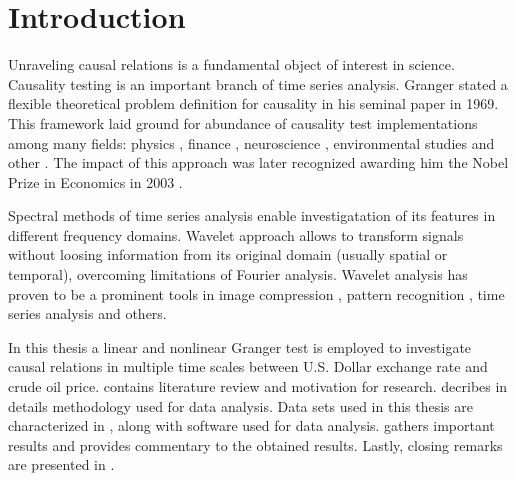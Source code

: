 \section{Introduction}

Unraveling causal relations is a fundamental object of interest in science.
Causality testing is an important branch of time series analysis.
Granger \cite{granger69} stated a flexible theoretical problem definition for causality in his seminal paper in 1969.
This framework laid ground for abundance of causality test implementations among many fields:
physics \cite{inverse-ising,coupled-oscillators},
finance \cite{hiemstra-jones, gold-stock},
neuroscience \cite{Bullmore2009,causality-eeg,causality-visual},
environmental studies \cite{dogan2016co,ecological-economics}
and other \cite{social-media}.
The impact of this approach was later recognized awarding him the Nobel Prize in Economics in 2003 \cite{nobel2003}.

Spectral methods of time series analysis enable investigatation of its features in different frequency domains.
Wavelet approach allows to transform signals without loosing information from its original domain (usually spatial or temporal), overcoming limitations of Fourier analysis.
Wavelet analysis has proven to be a prominent tools in image compression \cite{jpeg2000}, 
pattern recognition \cite{pattern-recognition}, 
time series analysis \cite{multifractal-time-series} 
and others.

In this thesis a linear and nonlinear Granger test is employed to investigate causal relations
in multiple time scales between U.S. Dollar exchange rate and crude oil price.
 contains literature review and motivation for research.
 decribes in details methodology used for data analysis.
Data sets used in this thesis are characterized in , along with software used for data analysis.
 gathers important results and provides commentary to the obtained results.
Lastly, closing remarks are presented in .

